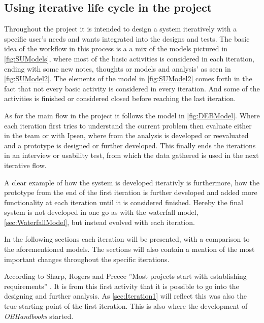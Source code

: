 
\subsection{Using iterative life cycle in the project}
Throughout the project it is intended to design a system iteratively with a specific user’s needs and wants integrated into the designs and tests. 
The basic idea of the workflow in this process is a a mix of the models pictured in \cref{fig:SUModels}, where most of the basic activities is considered in each iteration, ending with some new notes, thoughts or models and analysis' as seen in \cref{fig:SUModel2}.
The elements of the model in \cref{fig:SUModel2} comes forth in the fact that not every basic activity is considered in every iteration. And some of the activities is finished or considered closed before reaching the last iteration.

As for the main flow in the project it follows the model in \cref{fig:DEBModel}. Where each iteration first tries to understand the current problem then evaluate either in the team or with Ipsen, where from the analysis is developed or reevaluated and a prototype is designed or further developed.
This finally ends the iterations in an interview or usability test, from which the data gathered is used in the next iterative flow.

A clear example of how the system is developed iterativly is furthermore, how the prototype from the end of the first iteration is further developed and added more functionality at each iteration until it is considered finished.
Hereby the final system is not developed in one go as with the waterfall model, \cref{sec:WaterfallModel},  but instead evolved with each iteration.

In the following sections each iteration will be presented, with a comparison to the aforementioned models.
The sections will also contain a mention of the most important changes throughout the specific iterations. 

According to Sharp, Rogers and Preece ''Most projects start with establishing requirements'' \citep[p.~333]{InteractionDesign}. 
It is from this first activity that it is possible to go into the designing and further analysis.
As \cref{sec:Iteration1} will reflect this was also the true starting point of the first iteration.
This is also where the development of \textit{OBHandbooks} started.
